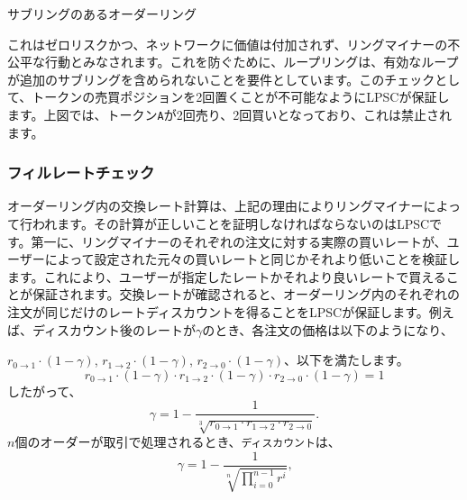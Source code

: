 \documentclass{article}
\makeatletter
\newenvironment{figurehere}
 {\def\@captype{figure}}
 {}
\makeatother
\begin{document}
\begin{multicols}{2}
\begin{center}
\begin{figurehere}

\caption{サブリングのあるオーダーリング}
\label{fig:subring}
\end{figurehere}
\end{center}

これはゼロリスクかつ、ネットワークに価値は付加されず、リングマイナーの不公平な行動とみなされます。これを防ぐために、ループリングは、有効なループが追加のサブリングを含められないことを要件としています。このチェックとして、トークンの売買ポジションを2回置くことが不可能なようにLPSCが保証します。上図では、トークン\verb|A|が2回売り、2回買いとなっており、これは禁止されます。


\subsubsection{フィルレートチェック\label{sec:fill_rate_check}}


オーダーリング内の交換レート計算は、上記の理由によりリングマイナーによって行われます。その計算が正しいことを証明しなければならないのはLPSCです。第一に、リングマイナーのそれぞれの注文に対する実際の買いレートが、ユーザーによって設定された元々の買いレートと同じかそれより低いことを検証します。これにより、ユーザーが指定したレートかそれより良いレートで買えることが保証されます。交換レートが確認されると、オーダーリング内のそれぞれの注文が同じだけのレートディスカウントを得ることをLPSCが保証します。例えば、ディスカウント後のレートが$\gamma$のとき、各注文の価格は以下のようになり、

$r_{0\rightarrow 1} \cdot (1-\gamma)$, $r_{1\rightarrow 2} \cdot (1-\gamma)$, $r_{2 \rightarrow 0} \cdot (1-\gamma)$、以下を満たします。 
\begin{equation}
r_{0\rightarrow 1} \cdot (1-\gamma)\cdot r_{1\rightarrow 2} \cdot (1-\gamma) \cdot r_{2 \rightarrow 0} \cdot (1-\gamma) = 1
\end{equation}
したがって、 
\begin{equation}
\gamma = 1- \frac{1}{\sqrt[3]{r_{0\rightarrow 1} \cdot r_{1\rightarrow 2} \cdot r_{2\rightarrow 0}}}\text{.}
\end{equation}
$n$個のオーダーが取引で処理されるとき、\texttt{ディスカウント}は、  
\begin{equation}
\gamma = 1- \frac{1}{\sqrt[n]{\prod_{i=0}^{n-1} r^i}} \text{,}
\end{equation}


\end{multicols}
\end{document}
